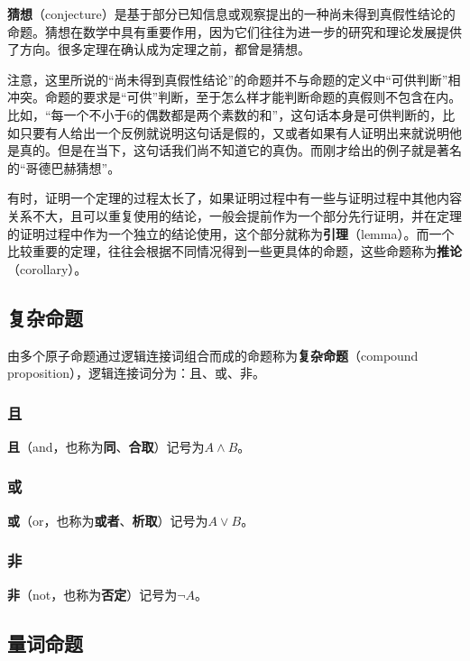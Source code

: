 \textbf{猜想}（conjecture）是基于部分已知信息或观察提出的一种尚未得到真假性结论的命题。猜想在数学中具有重要作用，因为它们往往为进一步的研究和理论发展提供了方向。很多定理在确认成为定理之前，都曾是猜想。

注意，这里所说的“尚未得到真假性结论”的命题并不与命题的定义中“可供判断”相冲突。命题的要求是“可供”判断，至于怎么样才能判断命题的真假则不包含在内。比如，“每一个不小于6的偶数都是两个素数的和”，这句话本身是可供判断的，比如只要有人给出一个反例就说明这句话是假的，又或者如果有人证明出来就说明他是真的。但是在当下，这句话我们尚不知道它的真伪。而刚才给出的例子就是著名的“哥德巴赫猜想”。

有时，证明一个定理的过程太长了，如果证明过程中有一些与证明过程中其他内容关系不大，且可以重复使用的结论，一般会提前作为一个部分先行证明，并在定理的证明过程中作为一个独立的结论使用，这个部分就称为\textbf{引理}（lemma）。而一个比较重要的定理，往往会根据不同情况得到一些更具体的命题，这些命题称为\textbf{推论}（corollary）。

\subsection{复杂命题}\label{sub_HsLogi_1}

由多个原子命题通过逻辑连接词组合而成的命题称为\textbf{复杂命题}（compound proposition），逻辑连接词分为：且、或、非。

\subsubsection{且}

\textbf{且}（and，也称为\textbf{同}、\textbf{合取}）记号为$A\land B$。

\subsubsection{或}

\textbf{或}（or，也称为\textbf{或者}、\textbf{析取}）记号为$A\lor B$。

\subsubsection{非}

\textbf{非}（not，也称为\textbf{否定}）记号为$\lnot A$。

\subsection{量词命题}

